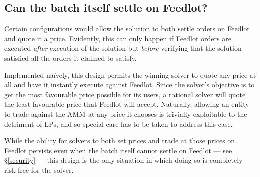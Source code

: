 \documentclass[a4paper,10pt]{article}
\theoremstyle{remark}
\begin{document}
\subsection{Can the batch itself settle on Feedlot?}
\label{solution-on-feedlot}

Certain configurations would allow the solution to both settle orders on Feedlot and quote it a price.
%
Evidently, this can only happen if Feedlot orders are executed \emph{after} execution of the solution but \emph{before} verifying that the solution satisfied all the orders it claimed to satisfy.

Implemented na\"ively, this design permits the winning solver to quote any price at all and have it instantly execute against Feedlot.
%
Since the solver's objective is to get the most favourable price possible for its users, a rational solver will quote the least favourable price that Feedlot will accept.
%
Naturally, allowing an entity to trade against the AMM at any price it chooses is trivially exploitable to the detriment of LPs, and so special care has to be taken to address this case.

While the ability for solvers to both set prices and trade at those prices on Feedlot persists even when the batch  itself cannot settle on Feedlot --- see \S\ref{security} --- this design is the only situation in which doing so is completely risk-free for the solver.
\end{document}
